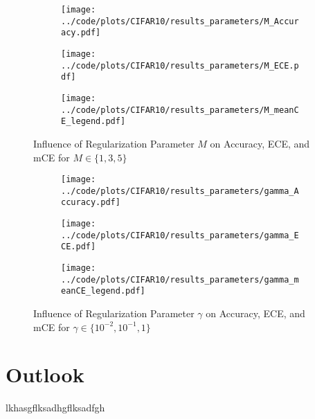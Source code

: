 \documentclass[a4paper, 11pt, oneside]{scrartcl}
\theoremstyle{break}
\numberwithin{equation}{section}
\begin{document}
			\begin{figure}[H]
				\centering
				\begin{subfigure}{.3\textwidth}
					\centering
					\texttt{[image: ../code/plots/CIFAR10/results\_parameters/M\_Accuracy.pdf]}
				\end{subfigure}%
				\begin{subfigure}{.3\textwidth}
					\centering
					\texttt{[image: ../code/plots/CIFAR10/results\_parameters/M\_ECE.pdf]}
				\end{subfigure}%
				\begin{subfigure}{.3\textwidth}
					\centering
					\texttt{[image: ../code/plots/CIFAR10/results\_parameters/M\_meanCE\_legend.pdf]}
				\end{subfigure}
				\caption{Influence of Regularization Parameter $M$ on Accuracy, ECE, and mCE for $M \in \{1, 3, 5\}$}
				\label{fig:M_ablation_study}
			\end{figure}

			\begin{figure}[H]
				\centering
				\begin{subfigure}{.3\textwidth}
					\centering
					\texttt{[image: ../code/plots/CIFAR10/results\_parameters/gamma\_Accuracy.pdf]}
				\end{subfigure}%
				\begin{subfigure}{.3\textwidth}
					\centering
					\texttt{[image: ../code/plots/CIFAR10/results\_parameters/gamma\_ECE.pdf]}
				\end{subfigure}%
				\begin{subfigure}{.3\textwidth}
					\centering
					\texttt{[image: ../code/plots/CIFAR10/results\_parameters/gamma\_meanCE\_legend.pdf]}
				\end{subfigure}
				\caption{Influence of Regularization Parameter $\gamma$ on Accuracy, ECE, and mCE for $\gamma \in \{10^{-2}, 10^{-1}, 1\}$}
				\label{fig:gamma_ablation_study}
			\end{figure}
			
	\section{Outlook}
		lkhasgflksadhgflksadfgh
\end{document}
